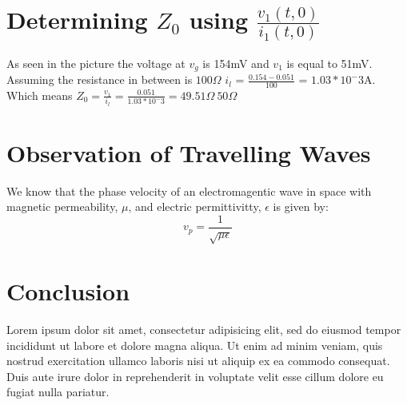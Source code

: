 \documentclass[10pt]{article}
\begin{document}
\section{Determining $Z_0$ using $\frac{v_1(t,0)}{i_1(t,0)}$}

As seen in the picture the voltage at $v_g$ is 154mV and $v_1$ is equal to 51mV. Assuming the resistance in between is $100\Omega$ 
 $i_l$ = $\frac{0.154-0.051}{100}$ = $1.03*10^-3$A. Which means $Z_0=\frac{v_1}{i_l}=\frac{0.051}{1.03*10^-3}=49.51\Omega~50\Omega $


\section{Observation of Travelling Waves}

We know that the phase velocity of an electromagentic wave in space with magnetic permeability, $\mu$,
and electric permittivitty, $\epsilon$  is given by:
$$v_p = \frac{1}{\sqrt{\mu \epsilon}}$$



\section{Conclusion}

Lorem ipsum dolor sit amet, consectetur adipisicing elit, sed do eiusmod tempor
incididunt ut labore et dolore magna aliqua. Ut enim ad minim veniam, quis
nostrud exercitation ullamco laboris nisi ut aliquip ex ea commodo consequat.
Duis aute irure dolor in reprehenderit in voluptate velit esse cillum dolore eu
fugiat nulla pariatur.
\end{document}
